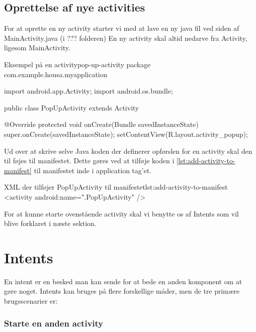 \subsection{Oprettelse af nye activities}

For at oprette en ny activity starter vi med at lave en ny java fil ved siden af MainActivity.java (i ??? folderen) En ny activity skal altid nedarve fra Activity, ligesom MainActivity. 

\begin{example}\noindent
	\begin{JavaCode}{Eksempel på en activity}{pop-up-activity}
		package com.example.housa.myapplication
		
		import android.app.Activity;
		import android.os.bundle;
		
		public class PopUpActivity extends Activity {
		  
		  @Override
		  protected void onCreate(Bundle savedInstanceState) {
		    super.onCreate(savedInstanceState);
		    setContentView(R.layout.activity_popup);
		  }
		}
	\end{JavaCode}
\end{example}

Ud over at skrive selve Java koden der definerer opførslen for en activity skal den til føjes til manifestet. Dette gøres ved at tilføje koden i \autoref{lst:add-activity-to-manifest} til manifestet inde i application tag'et.

\begin{example}\noindent
	\begin{XmlCode}{XML der tilføjer PopUpActivity til manifestet}{lst:add-activity-to-manifest}
		<activity android:name=".PopUpActivity" />
	\end{XmlCode}
\end{example}

For at kunne starte ovenstående activity skal vi benytte os af Intents som vil blive forklaret i næste sektion.


\section{Intents}

En intent er en besked man kan sende for at bede en anden komponent om at gøre noget. Intents kan bruges på flere forskellige måder, men de tre primære brugsscenarier er:

\subsubsection{Starte en anden activity}

